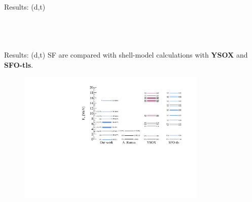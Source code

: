 \documentclass[aspectratio=43, dvipsnames]{beamer}
\newcommand{\iso}[2]{\ce{^{#1}#2}}
\begin{document}
\begin{frame}{Results: \iso{20}{O}(d,t)}
{\begin{columns}[c]
\begin{column}{0.6\linewidth}
			\end{column}%
			\begin{column}{0.4\linewidth}
				\\
			\end{column}
		\end{columns}
	}
\end{frame}

\begin{frame}{Results: \iso{20}{O}(d,t)}
	SF are compared with shell-model calculations with \textbf{YSOX} and \textbf{SFO-tls}.
	\begin{figure}
		\includegraphics[width=0.8\textwidth]{figures/normalized_models.pdf}
	\end{figure}
	\begin{columns}[c]
		\begin{column}{0.5\linewidth}
		\end{column}%
		\begin{column}{0.5\linewidth}
		\end{column}
	\end{columns}
\end{frame}
\end{document}
